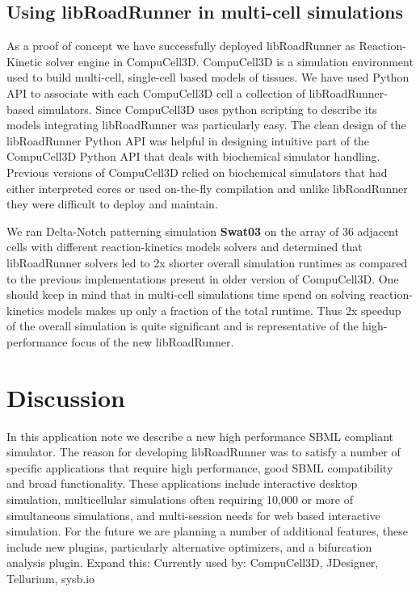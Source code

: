 \documentclass{bioinfo}
\begin{document}
\begin{methods}
\subsection{Using libRoadRunner in multi-cell simulations}

As a proof of concept we have successfully deployed libRoadRunner as Reaction-Kinetic solver engine in CompuCell3D. CompuCell3D is a simulation environment used to build multi-cell, single-cell based models of tissues. We have used Python API to associate with each CompuCell3D cell a collection of libRoadRunner-based simulators. Since CompuCell3D uses python scripting to describe its models integrating libRoadRunner was particularly easy. The clean design of the libRoadRunner Python API was helpful in designing intuitive part of the CompuCell3D Python API that deals with biochemical simulator handling. Previous versions of CompuCell3D relied on biochemical simulators that had either interpreted cores or used on-the-fly compilation and unlike libRoadRunner they were difficult to deploy and maintain. 

We ran Delta-Notch patterning simulation {\bf Swat03} on the array of 36 adjacent cells with different reaction-kinetics models solvers and determined that libRoadRunner solvers led to  2x shorter overall simulation runtimes as compared to the previous implementations present in older version of CompuCell3D. One should keep in mind that in multi-cell simulations time spend on solving reaction-kinetics models makes up only a fraction of the total runtime. Thus 2x  speedup of the overall simulation is quite significant and is representative of the high-performance focus of the new libRoadRunner. 
  

\end{methods}

\section{Discussion}

In this application note we describe a new high performance SBML compliant simulator. The reason for developing libRoadRunner was to satisfy a number of specific applications that require high performance, good SBML compatibility and broad functionality. These applications include interactive desktop simulation, multicellular simulations often requiring 10,000 or more of simultaneous simulations, and multi-session needs for web based interactive simulation.  For the future we are planning a number of additional features, these include new plugins, particularly alternative optimizers, and a bifurcation analysis plugin. Expand this: Currently used by: CompuCell3D, JDesigner, Tellurium, sysb.io
\end{document}
